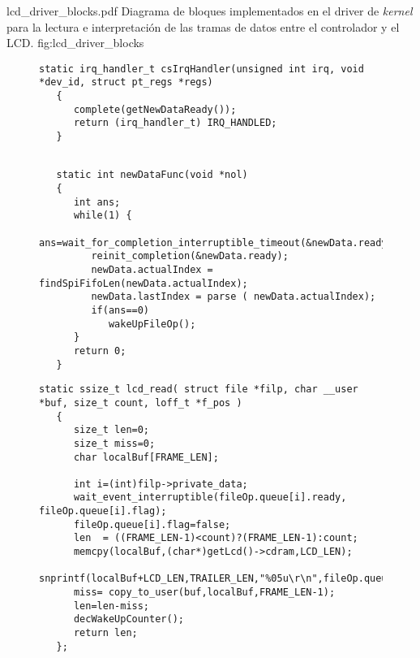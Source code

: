          {lcd_driver_blocks.pdf}
         {Diagrama de bloques implementados en el driver de \textit{kernel} para la lectura e interpretación de las tramas de datos entre el controlador y el LCD.}
         {fig:lcd_driver_blocks}

\begin{figure}[h]
   \begin{lstlisting}[caption={Manejador de la interrupción asociada a una transacción SPI. Cuando es llamada, activa toda la cadena de eventos que culmina con la actualización del estado de la pantalla.},label={cod:lcd_driver1}]
   static irq_handler_t csIrqHandler(unsigned int irq, void *dev_id, struct pt_regs *regs)
   {
      complete(getNewDataReady());
      return (irq_handler_t) IRQ_HANDLED;
   }
   \end{lstlisting}
\end{figure}

\begin{figure}[h]
   \begin{lstlisting}[label={cod:lcd_driver2},caption={Tarea que espera en modo bloqueante una nueva trama de datos. Utiliza uno de los métodos de comunicación interprocesos del \textit{kernel} de Linux.}]

   static int newDataFunc(void *nol)
   {
      int ans;
      while(1) {
         ans=wait_for_completion_interruptible_timeout(&newData.ready,msecs_to_jiffies(param_newDataTout));
         reinit_completion(&newData.ready);
         newData.actualIndex = findSpiFifoLen(newData.actualIndex);
         newData.lastIndex = parse ( newData.actualIndex);
         if(ans==0)
            wakeUpFileOp();
      }
      return 0;
   }
   \end{lstlisting}
\end{figure}

\begin{figure}[h]
   \begin{lstlisting}[label={cod:lcd_driver3},caption={Función que bloquea a la espera de una operación de lectura desde el espacio de usuario. Cuando es llamada, copia la nueva informacion de la pantalla.}]
   static ssize_t lcd_read( struct file *filp, char __user *buf, size_t count, loff_t *f_pos )
   {
      size_t len=0;
      size_t miss=0;
      char localBuf[FRAME_LEN];

      int i=(int)filp->private_data;
      wait_event_interruptible(fileOp.queue[i].ready, fileOp.queue[i].flag);
      fileOp.queue[i].flag=false;
      len  = ((FRAME_LEN-1)<count)?(FRAME_LEN-1):count;
      memcpy(localBuf,(char*)getLcd()->cdram,LCD_LEN);
      snprintf(localBuf+LCD_LEN,TRAILER_LEN,"%05u\r\n",fileOp.queue[i].frameNumber++);
      miss= copy_to_user(buf,localBuf,FRAME_LEN-1);
      len=len-miss;
      decWakeUpCounter();
      return len;
   };
   \end{lstlisting}
\end{figure}

